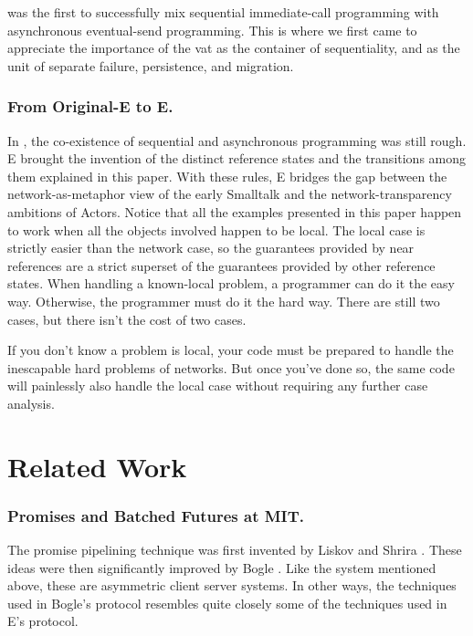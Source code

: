 \documentclass{llncs}
\begin{document}
 was the first to successfully mix sequential
immediate-call programming with asynchronous eventual-send
programming. This is where we first came to appreciate the importance
of the vat as the container of sequentiality, and as the unit of
separate failure, persistence, and migration.

\subsubsection{From Original-E to E.} In , the
co-existence of sequential and asynchronous programming was still
rough. E brought the invention of the distinct reference states and
the transitions among them explained in this paper. With these rules,
E bridges the gap between the network-as-metaphor view of the early
Smalltalk and the network-transparency ambitions of Actors. Notice
that all the examples presented in this paper happen to work when all
the objects involved happen to be local. The local case is strictly
easier than the network case, so the guarantees provided by near
references are a strict superset of the guarantees provided by other
reference states. When handling a known-local problem, a programmer
can do it the easy way. Otherwise, the programmer must do it the hard
way. There are still two cases, but there isn't the cost of two cases.

If you don't know a problem is local, your code must be prepared to
handle the inescapable hard problems of networks. But once you've done
so, the same code will painlessly also handle the local case without
requiring any further case analysis.

\section{Related Work}

\subsubsection{Promises and Batched Futures at MIT.} The promise
pipelining technique was first invented by Liskov and Shrira
\cite{liskov:promises}. These ideas were then significantly improved
by Bogle \cite{bogle:batched}. Like the  system
mentioned above, these are asymmetric client server systems. In other
ways, the techniques used in Bogle's protocol resembles quite closely
some of the techniques used in E's protocol.
\end{document}
